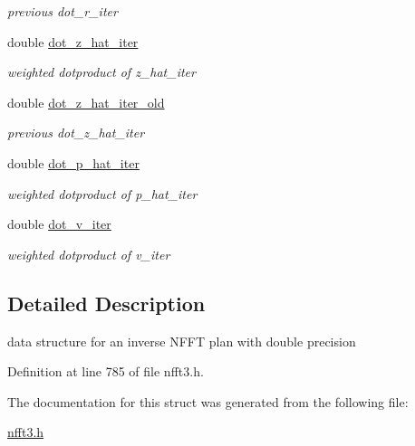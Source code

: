 \begin{DoxyCompactItemize}
\begin{DoxyCompactList}\small\item\em previous dot\-\_\-r\-\_\-iter \end{DoxyCompactList}\item 
\hypertarget{structsolver__plan__complex_aba91d7700d200a0b15cecf8aafcef0df}{double \hyperlink{structsolver__plan__complex_aba91d7700d200a0b15cecf8aafcef0df}{dot\-\_\-z\-\_\-hat\-\_\-iter}}\label{structsolver__plan__complex_aba91d7700d200a0b15cecf8aafcef0df}

\begin{DoxyCompactList}\small\item\em weighted dotproduct of z\-\_\-hat\-\_\-iter \end{DoxyCompactList}\item 
\hypertarget{structsolver__plan__complex_aadb97426a0e35fd46a65557c56b055ee}{double \hyperlink{structsolver__plan__complex_aadb97426a0e35fd46a65557c56b055ee}{dot\-\_\-z\-\_\-hat\-\_\-iter\-\_\-old}}\label{structsolver__plan__complex_aadb97426a0e35fd46a65557c56b055ee}

\begin{DoxyCompactList}\small\item\em previous dot\-\_\-z\-\_\-hat\-\_\-iter \end{DoxyCompactList}\item 
\hypertarget{structsolver__plan__complex_a0cced7bb2f3b85b75b765d796e2c741d}{double \hyperlink{structsolver__plan__complex_a0cced7bb2f3b85b75b765d796e2c741d}{dot\-\_\-p\-\_\-hat\-\_\-iter}}\label{structsolver__plan__complex_a0cced7bb2f3b85b75b765d796e2c741d}

\begin{DoxyCompactList}\small\item\em weighted dotproduct of p\-\_\-hat\-\_\-iter \end{DoxyCompactList}\item 
\hypertarget{structsolver__plan__complex_a0561b1d4bd014a175ef75d069cc592de}{double \hyperlink{structsolver__plan__complex_a0561b1d4bd014a175ef75d069cc592de}{dot\-\_\-v\-\_\-iter}}\label{structsolver__plan__complex_a0561b1d4bd014a175ef75d069cc592de}

\begin{DoxyCompactList}\small\item\em weighted dotproduct of v\-\_\-iter \end{DoxyCompactList}\end{DoxyCompactItemize}


\subsection{Detailed Description}
data structure for an inverse N\-F\-F\-T plan with double precision 

Definition at line 785 of file nfft3.\-h.



The documentation for this struct was generated from the following file\-:\begin{DoxyCompactItemize}
\item 
\hyperlink{nfft3_8h}{nfft3.\-h}\end{DoxyCompactItemize}
